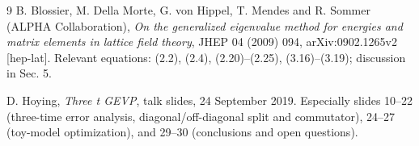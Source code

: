 \documentclass[11pt]{article}
\begin{document}
\begin{thebibliography}{9}
B. Blossier, M. Della Morte, G. von Hippel, T. Mendes and R. Sommer (ALPHA Collaboration),
\emph{On the generalized eigenvalue method for energies and matrix elements in lattice field theory},
JHEP 04 (2009) 094, arXiv:0902.1265v2 [hep-lat].
Relevant equations: (2.2), (2.4), (2.20)--(2.25), (3.16)--(3.19); discussion in Sec. 5.

D. Hoying, \emph{Three t GEVP}, talk slides, 24 September 2019.
Especially slides 10--22 (three-time error analysis, diagonal/off-diagonal split and commutator), 24--27 (toy-model optimization), and 29--30 (conclusions and open questions).
\end{thebibliography}
\end{document}
